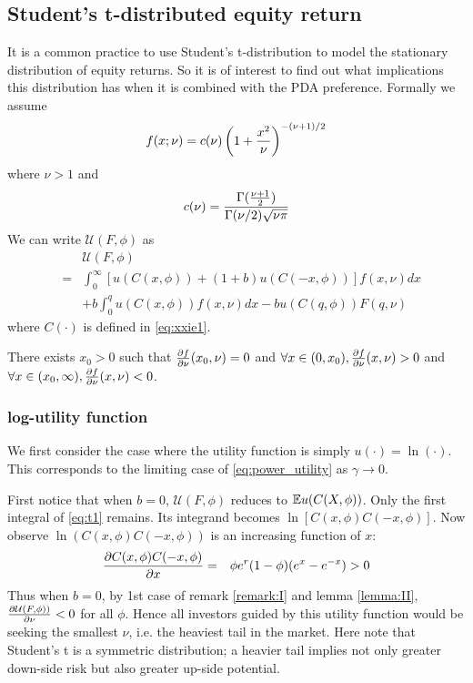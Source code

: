 \documentclass{article}
\begin{document}

\subsection{Student's t-distributed equity return}
It is a common practice to use Student's t-distribution to model the
stationary distribution of equity returns. So it is of interest to
find out what implications this distribution has when it is combined
with the PDA preference. Formally we assume
\[
f(x; \nu) = c(\nu) \left(
  1 + {x^2 \over \nu}
\right)^{-(\nu + 1)/2}
\]
where $\nu > 1$ and
\[
c(\nu) = {
  \Gamma({\nu + 1 \over 2})
  \over
  \Gamma(\nu/2) \sqrt{\nu \pi}
}
\]
We can write $\mathcal U(F, \phi)$ as
\begin{eqnarray}
  && \mathcal U(F, \phi) \nonumber \\
  &=&
  \int_{0}^{\infty}
  \left[
    u(C(x, \phi)) + (1 + b)u(C(-x, \phi))
  \right]
  f(x, \nu) dx \nonumber \\
  &&
  + b \int_{0}^{q}
  u(C(x, \phi))
  f(x, \nu) dx - b u(C(q, \phi)) F(q, \nu)
  \label{eq:t1}
\end{eqnarray}
where $C(\cdot)$ is defined in \eqref{eq:xxie1}.

\begin{lemma}
  \label{lemma:II}
  There exists $x_0 > 0$ such that $\frac{\partial f}{\partial \nu}(x_0, \nu) = 0$ and
  $\forall x \in (0, x_0), \frac{\partial f}{\partial \nu}(x, \nu) > 0$ and
  $\forall x \in (x_0, \infty), \frac{\partial f}{\partial \nu}(x, \nu) < 0$.
\end{lemma}

\subsubsection{log-utility function}
We first consider the case where the utility function is simply
$u(\cdot) = \ln(\cdot)$. This corresponds to the limiting case of
\eqref{eq:power_utility} as $\gamma \to 0$.

First notice that when $b = 0$, $\mathcal U(F, \phi)$ reduces to
$\mathbb{E} u(C(X, \phi))$. Only the first integral of \eqref{eq:t1} remains.
Its integrand becomes $\ln[C(x, \phi) C(-x, \phi)]$.
Now observe $\ln(C(x, \phi)C(-x, \phi))$ is an increasing function of
$x$:
\begin{eqnarray*}
  \frac{\partial C(x, \phi) C(-x, \phi)}{\partial x}
  &=&
  \phi e^r (1 - \phi) (e^x - e^{-x}) > 0
\end{eqnarray*}
Thus when $b = 0$, by 1st case of remark \ref{remark:I} and lemma
\ref{lemma:II},
$\frac{\partial \mathcal U(F, \phi))}{\partial \nu} < 0$ for all $\phi$. Hence all
investors guided by this utility function would be seeking the
smallest $\nu$, i.e. the heaviest tail in the market. Here note that
Student's t is a symmetric distribution; a heavier tail implies not
only greater down-side risk but also greater up-side potential.
\end{document}
